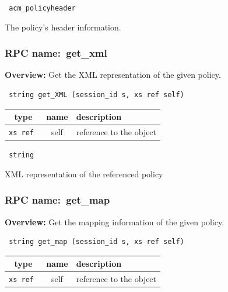 \vspace{0.3cm}

{\tt
acm\_policyheader
}


The policy's header information.
\vspace{0.3cm}
\vspace{0.3cm}
\vspace{0.3cm}
\subsubsection{RPC name:~get\_xml}

{\bf Overview:}
Get the XML representation of the given policy.

\begin{verbatim} string get_XML (session_id s, xs ref self)\end{verbatim}




\vspace{0.3cm}
\begin{tabular}{|c|c|p{7cm}|}
 \hline
{\bf type} & {\bf name} & {\bf description} \\ \hline
{\tt xs ref } & self & reference to the object \\ \hline

\end{tabular}

\vspace{0.3cm}

{\tt
string
}


XML representation of the referenced policy
\vspace{0.3cm}
\vspace{0.3cm}
\vspace{0.3cm}
\subsubsection{RPC name:~get\_map}

{\bf Overview:}
Get the mapping information of the given policy.

\begin{verbatim} string get_map (session_id s, xs ref self)\end{verbatim}




\vspace{0.3cm}
\begin{tabular}{|c|c|p{7cm}|}
 \hline
{\bf type} & {\bf name} & {\bf description} \\ \hline
{\tt xs ref } & self & reference to the object \\ \hline

\end{tabular}

